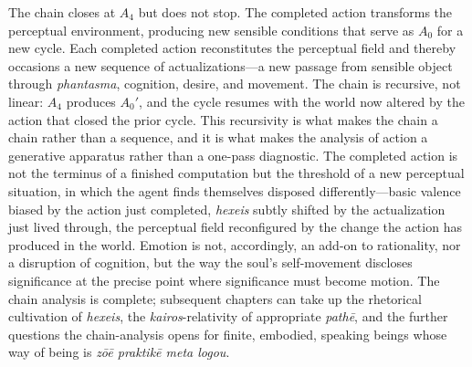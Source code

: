 The chain closes at $A_4$ but does not stop. The completed action transforms the perceptual environment, producing new sensible conditions that serve as $A_0$ for a new cycle. Each completed action reconstitutes the perceptual field and thereby occasions a new sequence of actualizations---a new passage from sensible object through \textit{phantasma}, cognition, desire, and movement. The chain is recursive, not linear: $A_4$ produces $A_0'$, and the cycle resumes with the world now altered by the action that closed the prior cycle. This recursivity is what makes the chain a chain rather than a sequence, and it is what makes the analysis of action a generative apparatus rather than a one-pass diagnostic. The completed action is not the terminus of a finished computation but the threshold of a new perceptual situation, in which the agent finds themselves disposed differently---basic valence biased by the action just completed, \textit{hexeis} subtly shifted by the actualization just lived through, the perceptual field reconfigured by the change the action has produced in the world. Emotion is not, accordingly, an add-on to rationality, nor a disruption of cognition, but the way the soul's self-movement discloses significance at the precise point where significance must become motion. The chain analysis is complete; subsequent chapters can take up the rhetorical cultivation of \textit{hexeis}, the \textit{kairos}-relativity of appropriate \textit{pathē}, and the further questions the chain-analysis opens for finite, embodied, speaking beings whose way of being is \textit{zōē praktikē meta logou}.
